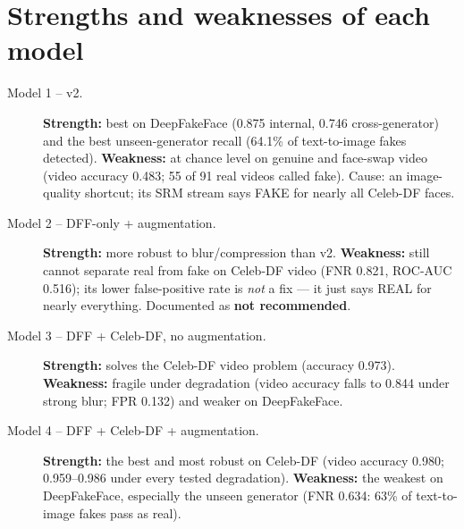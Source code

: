 \documentclass[11pt,a4paper]{report}
\begin{document}
\section{Strengths and weaknesses of each model}
\begin{description}
\item[Model 1 -- v2.] \textbf{Strength:} best on DeepFakeFace (0.875 internal, 0.746 cross-generator) and the best unseen-generator recall (64.1\% of text-to-image fakes detected). \textbf{Weakness:} at chance level on genuine and face-swap video (video accuracy 0.483; 55 of 91 real videos called fake). Cause: an image-quality shortcut; its SRM stream says FAKE for nearly all Celeb-DF faces.
\item[Model 2 -- DFF-only + augmentation.] \textbf{Strength:} more robust to blur/compression than v2. \textbf{Weakness:} still cannot separate real from fake on Celeb-DF video (FNR 0.821, ROC-AUC 0.516); its lower false-positive rate is \emph{not} a fix --- it just says REAL for nearly everything. Documented as \textbf{not recommended}.
\item[Model 3 -- DFF + Celeb-DF, no augmentation.] \textbf{Strength:} solves the Celeb-DF video problem (accuracy 0.973). \textbf{Weakness:} fragile under degradation (video accuracy falls to 0.844 under strong blur; FPR 0.132) and weaker on DeepFakeFace.
\item[Model 4 -- DFF + Celeb-DF + augmentation.] \textbf{Strength:} the best and most robust on Celeb-DF (video accuracy 0.980; 0.959--0.986 under every tested degradation). \textbf{Weakness:} the weakest on DeepFakeFace, especially the unseen generator (FNR 0.634: 63\% of text-to-image fakes pass as real).
\end{description}
\end{document}
